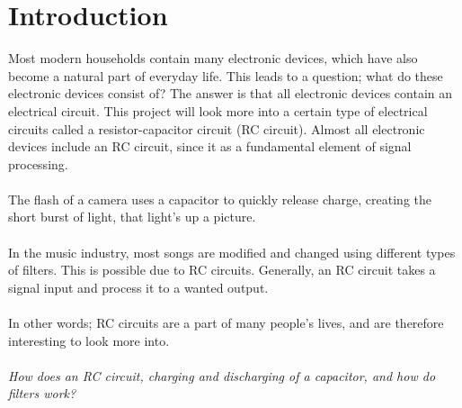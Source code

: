 \chapter{Introduction}
Most modern households contain many electronic devices, which have also become a natural part of everyday life. This leads to a question; what do these electronic devices consist of? The answer is that all electronic devices contain an electrical circuit. This project will look more into a certain type of electrical circuits called a resistor-capacitor circuit (RC circuit). Almost all electronic devices include an RC circuit, since it as a fundamental element of signal processing. 
\\ \\
The flash of a camera uses a capacitor to quickly release charge, creating the short burst of light, that light’s up a picture.
\\ \\
In the music industry, most songs are modified and changed using different types of filters. This is possible due to RC circuits. Generally, an RC circuit takes a signal input and process it to a wanted output. 
\\ \\
In other words; RC circuits are a part of many people’s lives, and are therefore interesting to look more into. 
\\ \\
\textit{How does an RC circuit, charging and discharging of a capacitor, and how do filters work?}
